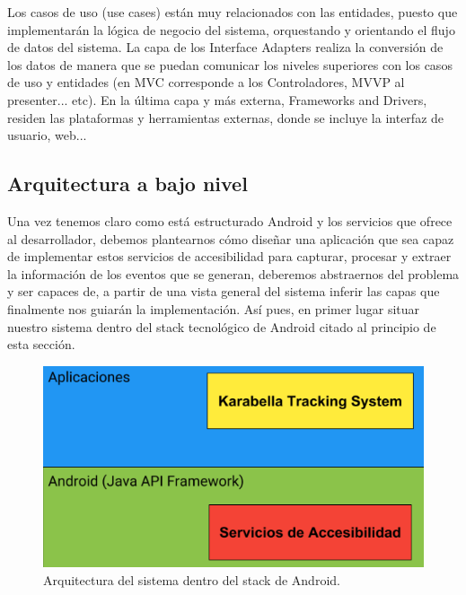 \documentclass[12pt,a4paper,oneside]{book} %
\begin{document}
Los casos de uso (use cases) están muy relacionados con las entidades, puesto que implementarán la lógica de negocio del sistema, orquestando y orientando el flujo de datos del sistema. 
\newline
\newline
La capa de los Interface Adapters realiza la conversión de los datos de manera que se puedan comunicar los niveles superiores con los casos de uso y entidades (en MVC corresponde a los Controladores, MVVP al presenter... etc). 
\newline
\newline
En la última capa y más externa, Frameworks and Drivers, residen las plataformas y herramientas externas, donde se incluye la interfaz de usuario, web... 
\newpage
\subsection{Arquitectura a bajo nivel}
Una vez tenemos claro como está estructurado Android y los servicios que ofrece al desarrollador, debemos plantearnos cómo diseñar una aplicación que sea capaz de implementar estos servicios de accesibilidad para capturar, procesar y extraer la  información de los eventos que se generan, deberemos abstraernos del problema y ser capaces de, a partir de una vista general del sistema inferir las capas que finalmente nos guiarán la implementación. 
\newline
\newline
Así pues, en primer lugar situar nuestro sistema dentro del stack tecnológico de Android citado al principio de esta sección. 
\newline
\begin{figure}[H]
	\begin{center}
		\includegraphics[scale=0.6]{pictures/architecture/arquitecturaGeneral01.png} 
	\end{center}
	\caption[Arquitectura dentro del android stack]{Arquitectura del sistema dentro del stack de Android.}
\end{figure}
\end{document}
